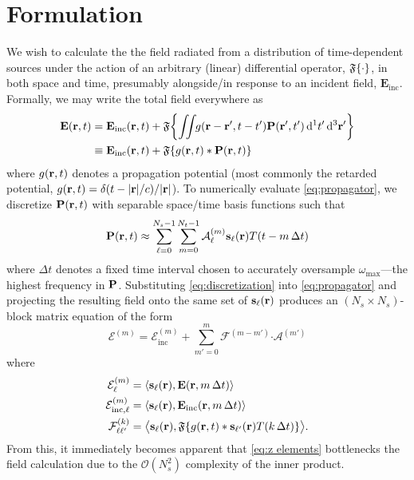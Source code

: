 \section{Formulation}

We wish to calculate the the field radiated from a distribution of time-dependent sources under the action of an arbitrary (linear) differential operator, $\mathfrak{F}\qty{\cdot}$, in both space and time, presumably alongside/in response to an incident field, $\mathbf{E}_\text{inc}$.
Formally, we may write the total field everywhere as
\begin{equation}
  \begin{aligned}
    \vb{E}(\vb{r}, t) & = \vb{E}_\text{inc}(\vb{r}, t) + \mathfrak{F}\qty{\iint_{} \kern0.1emg(\vb{r} - \vb{r}', t - t') \vb{P}(\vb{r}', t') \dd[1]{t'} \dd[3]{\vb{r}'}} \\
                      & \equiv \vb{E}_\text{inc}(\vb{r}, t) + \mathfrak{F}\qty{g(\vb{r}, t) \ast \vb{P}(\vb{r}, t)}
    \end{aligned}
  \label{eq:propagator}
\end{equation}
where $g(\vb{r}, t)$ denotes a propagation potential (most commonly the retarded potential, $g(\vb{r}, t) = \delta(t - \abs{\vb{r}}/c)/\abs{\vb{r}}$).
To numerically evaluate \cref{eq:propagator}, we discretize $\vb{P}(\vb{r}, t)$ with separable space/time basis functions such that 
\begin{equation}
  \vb{P}(\vb{r}, t) \approx \sum_{\ell = 0}^{N_s - 1} \sum_{m = 0}^{N_t - 1} \mathcal{A}_\ell^{(m)} \vb{s}_\ell(\vb{r}) T(t - m \, \Delta t)
  \label{eq:discretization}
\end{equation}
where $\Delta t$ denotes a fixed time interval chosen to accurately oversample $\omega_\text{max}$---the highest frequency in $\vb{P}$.
Substituting \cref{eq:discretization} into \cref{eq:propagator} and projecting the resulting field onto the same set of $\vb{s}_\ell(\vb{r})$ produces an $(N_s \times N_s)$-block matrix equation of the form
\begin{equation}
  \mathcal{E}^{(m)} = \mathcal{E}_\text{inc}^{(m)} + \sum_{m'= 0}^m \mathcal{F}^{(m - m')} \boldsymbol{\cdot} \mathcal{A}^{(m')}
  \label{eq:mot}
\end{equation}
where
\begin{subequations}
  \begin{align}
    \mathcal{E}^{(m)}_\ell &= \langle \vb{s}_\ell(\vb{r}), \vb{E}(\vb{r}, m \, \Delta t) \rangle \label{eq:f elements}\\
    \mathcal{E}^{(m)}_{\text{inc},\ell} &= \langle \vb{s}_\ell(\vb{r}), \vb{E}_\text{inc}(\vb{r}, m \, \Delta t) \rangle \label{eq:l elements}\\
    \mathcal{F}^{(k)}_{\ell\ell'} &= \big\langle \vb{s}_\ell(\vb{r}), \mathfrak{F}\qty{g(\vb{r}, t) \ast \vb{s}_{\ell'}(\vb{r}) T(k \, \Delta t)} \big\rangle \label{eq:z elements}.
  \end{align}
\end{subequations}
From this, it immediately becomes apparent that \cref{eq:z elements} bottlenecks the field calculation due to the $\mathcal{O}(N_s^2)$ complexity of the inner product.

